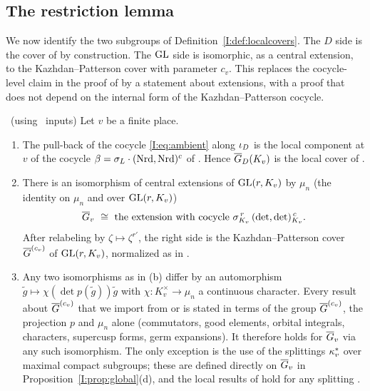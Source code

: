 \subsection{The restriction lemma}\label{I:subsec:restriction}
We now identify the two subgroups of Definition~\ref{I:def:localcovers}. The $D$ side is the cover of \cite{JC26a} by construction. The $\mathrm{GL}$ side is isomorphic, as a central extension, to the Kazhdan--Patterson cover with parameter $c_v$. This replaces the cocycle-level claim in the proof of \cite[Lemma~6.1(c)]{JC26a} by a statement about extensions, with a proof that does not depend on the internal form of the Kazhdan--Patterson cocycle.

\begin{proposition}\label{I:prop:restriction}\ (using \Ev\ inputs)
Let $v$ be a finite place.
\begin{enumerate}[label=(\alph*)]
\item The pull-back of the cocycle \eqref{I:eq:ambient} along $\iota_D$ is the local component at $v$ of the cocycle $\beta=\sigma_L\cdot(\operatorname{Nrd},\operatorname{Nrd})^c$ of \cite[equation~(4)]{JC26a}. Hence $\overline{G}_D(K_v)$ is the local cover of \cite[\S6.1]{JC26a}.
\item There is an isomorphism of central extensions of $\mathrm{GL}(r,K_v)$ by $\mu_n$ (the identity on $\mu_n$ and over $\mathrm{GL}(r,K_v)$)
\[ \overline{G}_v\ \cong\ \text{the extension with cocycle }\sigma_{K_v}^{\,r}\,(\det,\det)_{K_v}^{\,c}. \]
After relabeling by $\zeta\mapsto\zeta^{r'}$, the right side is the Kazhdan--Patterson cover $\overline{G}^{(c_v)}$ of $\mathrm{GL}(r,K_v)$, normalized as in \cite[Lemma~2.1]{JC26a}.
\item Any two isomorphisms as in (b) differ by an automorphism $\tilde g\mapsto\chi(\det p(\tilde g))\tilde g$ with $\chi:K_v^\times\to\mu_n$ a continuous character. Every result about $\overline{G}^{(c_v)}$ that we import from \cite{FK86} or \cite{KP84} is stated in terms of the group $\overline{G}^{(c_v)}$, the projection $p$ and $\mu_n$ alone (commutators, good elements, orbital integrals, characters, supercusp forms, germ expansions). It therefore holds for $\overline{G}_v$ via any such isomorphism. The only exception is the use of the splittings $\kappa^{*}_v$ over maximal compact subgroups; these are defined directly on $\overline{G}_v$ in Proposition~\ref{I:prop:global}(d), and the local results of \cite{JC26a} hold for any splitting \cite[Remarks after Lemma~6.1]{JC26a}.
\end{enumerate}
\end{proposition}

